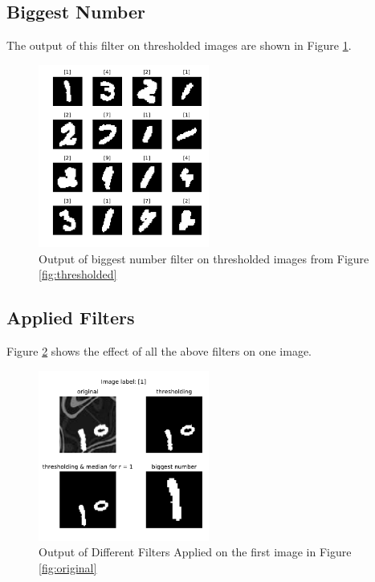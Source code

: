 \documentclass[letterpaper, 10 pt, conference]{ieeeconf}  %
\begin{document}
\subsection{Biggest Number}
The output of this filter on thresholded images are shown in Figure \ref{fig:biggest}.
\begin{figure}[h]
	\begin{center}
		\includegraphics[width=0.5\textwidth]{figures/BiggestDataset.pdf}  %
		\caption{Output of biggest number filter on thresholded images from Figure \ref{fig:thresholded}}
		\label{fig:biggest}
	\end{center}
\end{figure}

\subsection{Applied Filters}
Figure \ref{fig:allFilters} shows the effect of all the above filters on one image. 
\begin{figure}[h]
	\begin{center}
		\includegraphics[width=0.5\textwidth]{figures/allDataset.pdf}  %
		\caption{Output of Different Filters Applied on the first image in Figure \ref{fig:original}}
		\label{fig:allFilters}
	\end{center}
\end{figure}
\end{document}
